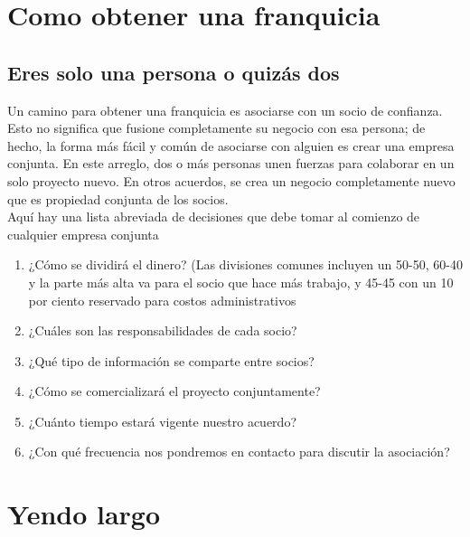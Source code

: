\documentclass[10pt]{book}
\begin{document}
    \chapter{Como obtener una franquicia}
	\section{Eres solo una persona o quizás dos}
	    Un camino para obtener una franquicia es asociarse con un socio de confianza. Esto no significa que fusione completamente su negocio con esa persona; de hecho, la forma más fácil y común de asociarse con alguien es crear una empresa conjunta. En este arreglo, dos o más personas unen fuerzas para colaborar en un solo proyecto nuevo. En otros acuerdos, se crea un negocio completamente nuevo que es propiedad conjunta de los socios.\\
	    Aquí hay una lista abreviada de decisiones que debe tomar al comienzo de cualquier empresa conjunta
	    \begin{enumerate}
		    \item ¿Cómo se dividirá el dinero? (Las divisiones comunes incluyen un 50-50, 60-40 y la parte más alta va para el socio que hace más trabajo, y 45-45 con un 10 por ciento reservado para costos administrativos
		    \item ¿Cuáles son las responsabilidades de cada socio?
		    \item ¿Qué tipo de información se comparte entre socios?
		    \item ¿Cómo se comercializará el proyecto conjuntamente?
		    \item ¿Cuánto tiempo estará vigente nuestro acuerdo?
		    \item ¿Con qué frecuencia nos pondremos en contacto para discutir la asociación?
	    \end{enumerate}

    \chapter{Yendo largo}

	    
\end{document}
